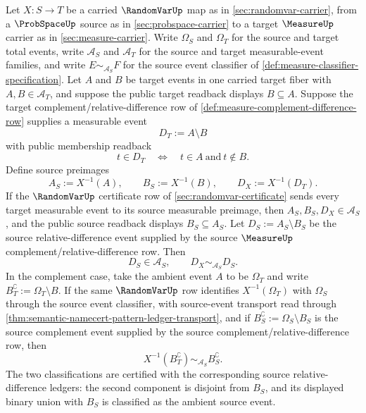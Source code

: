 \begin{theorem}
\label{thm:randomvar-preimage-complement-difference-exactness}
Let $X:S\to T$ be a carried $\RandomVarUp$ map as in \autoref{sec:randomvar-carrier}, from a $\ProbSpaceUp$ source as in \autoref{sec:probspace-carrier} to a target $\MeasureUp$ carrier as in \autoref{sec:measure-carrier}. Write $\Omega_S$ and $\Omega_T$ for the source and target total events, write $\mathcal{A}_S$ and $\mathcal{A}_T$ for the source and target measurable-event families, and write $E\sim_{\mathcal{A}_S}F$ for the source event classifier of \autoref{def:measure-classifier-specification}. Let $A$ and $B$ be target events in one carried target fiber with $A,B\in\mathcal{A}_T$, and suppose the public target readback displays $B\subseteq A$. Suppose the target complement/relative-difference row of \autoref{def:measure-complement-difference-row} supplies a measurable event
$$
D_T:=A\setminus B
$$
with public membership readback
$$
t\in D_T\quad\Longleftrightarrow\quad t\in A\ \text{and}\ t\notin B.
$$
Define source preimages
$$
A_S:=X^{-1}(A),\qquad B_S:=X^{-1}(B),\qquad D_X:=X^{-1}(D_T).
$$
If the $\RandomVarUp$ certificate row of \autoref{sec:randomvar-certificate} sends every target measurable event to its source measurable preimage, then $A_S,B_S,D_X\in\mathcal{A}_S$, and the public source readback displays $B_S\subseteq A_S$. Let $D_S:=A_S\setminus B_S$ be the source relative-difference event supplied by the source $\MeasureUp$ complement/relative-difference row. Then
$$
D_S\in\mathcal{A}_S,\qquad D_X\sim_{\mathcal{A}_S}D_S.
$$
In the complement case, take the ambient event $A$ to be $\Omega_T$ and write $B_T^{\complement}:=\Omega_T\setminus B$. If the same $\RandomVarUp$ row identifies $X^{-1}(\Omega_T)$ with $\Omega_S$ through the source event classifier, with source-event transport read through \autoref{thm:semantic-namecert-pattern-ledger-transport}, and if $B_S^{\complement}:=\Omega_S\setminus B_S$ is the source complement event supplied by the source complement/relative-difference row, then
$$
X^{-1}(B_T^{\complement})\sim_{\mathcal{A}_S}B_S^{\complement}.
$$
The two classifications are certified with the corresponding source relative-difference ledgers: the second component is disjoint from $B_S$, and its displayed binary union with $B_S$ is classified as the ambient source event.
\end{theorem}
